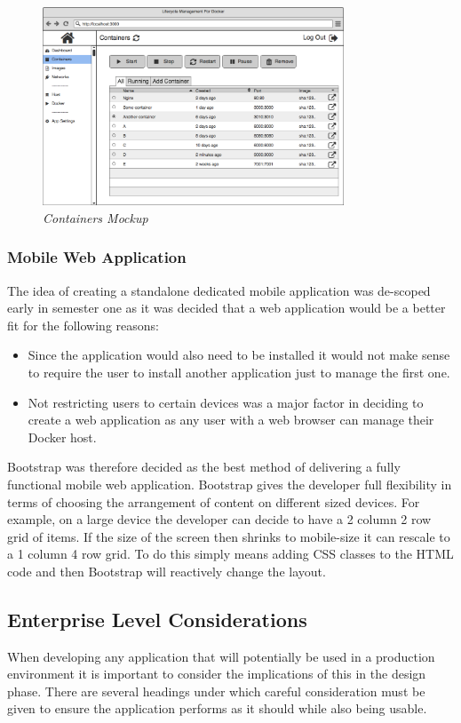 \begin{figure}[!ht]
\centering
\includegraphics*[width=0.8\textwidth]{wireframes/containers}
\caption{\em Containers Mockup}
\label{fig:containers_wireframe}
\end{figure}

\subsubsection{Mobile Web Application}
The idea of creating a standalone dedicated mobile application was de-scoped early in semester one as it was decided that a web application would be a better fit for the following reasons:

\begin{itemize}
	\item Since the application would also need to be installed it would not make sense to require the user to install another application just to manage the first one.
	\item Not restricting users to certain devices was a major factor in deciding to create a web application as any user with a web browser can manage their \gls{Docker host}.
\end{itemize} 

\gls{Bootstrap} was therefore decided as the best method of delivering a fully functional mobile web application. Bootstrap gives the developer full flexibility in terms of choosing the arrangement of content on different sized devices. For example, on a large device the developer can decide to have a 2 column 2 row grid of items. If the size of the screen then shrinks to mobile-size it can rescale to a 1 column 4 row grid. To do this simply means adding \gls{CSS} classes to the \gls{HTML} code and then Bootstrap will reactively change the layout.

\subsection{Enterprise Level Considerations}
When developing any application that will potentially be used in a production environment it is important to consider the implications of this in the design phase. There are several headings under which careful consideration must be given to ensure the application performs as it should while also being usable.

